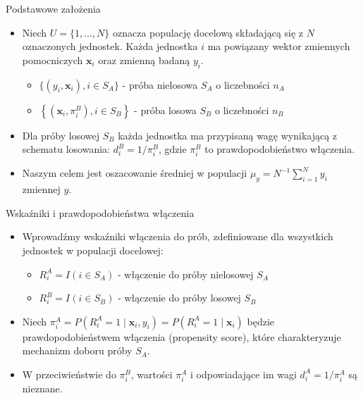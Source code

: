 \documentclass[10pt,ignorenonframetext, aspectratio=169]{beamer}
\newcommand{\bx}{\boldsymbol{x}}
\begin{document}
\begin{frame}{Podstawowe założenia}

\begin{itemize}
\justifying
    \item Niech $U=\{1,..., N\}$ oznacza populację docelową składającą się z $N$ oznaczonych jednostek. Każda jednostka $i$ ma powiązany wektor zmiennych pomocniczych $\bx_{i}$ oraz zmienną badaną $y_{i}$. 
     \begin{itemize}
        \item $\{ (y_i, \bx_i), i \in S_A\}$ - próba nielosowa $S_A$ o liczebności $n_A$
        \item $\left\{\left(\bx_i, \pi_{i}^B\right), i \in S_B\right\}$ - próba losowa $S_B$ o liczebności $n_B$
    \end{itemize}
    \item Dla próby losowej $S_B$ każda jednostka ma przypisaną wagę wynikającą z schematu losowania: $d_i^B = 1/\pi_i^B$, gdzie $\pi_i^B$ to prawdopodobieństwo włączenia.
    \item Naszym celem jest oszacowanie średniej w populacji $\mu_y=N^{-1}\sum_{i=1}^{N} y_{i}$ zmiennej $y$.
\end{itemize}

\end{frame}

\begin{frame}{Wskaźniki i prawdopodobieństwa włączenia}

\begin{itemize}
\justifying
    \item Wprowadźmy wskaźniki włączenia do prób, zdefiniowane dla wszystkich jednostek w populacji docelowej:
     \begin{itemize}
        \item $R_i^A=I(i \in S_A)$ - włączenie do próby nielosowej $S_A$
        \item $R_i^B=I(i \in S_B)$ - włączenie do próby losowej $S_B$
    \end{itemize}
    \item Niech $\pi_i^A=P(R_i^A=1 \mid \bx_i, y_i)=P(R_i^A=1 \mid \bx_i)$ będzie prawdopodobieństwem włączenia (propensity score), które charakteryzuje mechanizm doboru próby $S_A$.
    \item W przeciwieństwie do $\pi_i^B$, wartości $\pi_i^A$ i odpowiadające im wagi $d_i^A=1/\pi_i^A$ są nieznane.
\end{itemize}
    
\end{frame}
\end{document}
